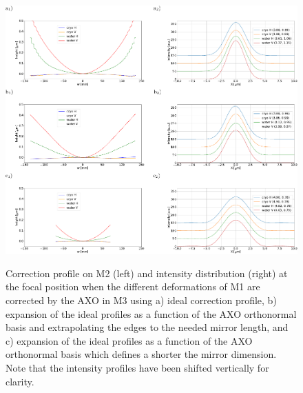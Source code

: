 \documentclass{iucr}
\begin{document}
   \begin{figure}
   \label{fig:intensitycorrected} 
   \includegraphics[width=1.0\textwidth]{figures/fig4.pdf}\\
   \caption
   { Correction profile on M2 (left) and intensity distribution (right) at the focal position when the different deformations of M1 are corrected by the AXO in M3 using  a) ideal correction profile, b)  expansion of the ideal profiles as a function of the AXO orthonormal basis and extrapolating the edges to the needed mirror length, and c)  expansion of the ideal profiles as a function of the AXO orthonormal basis which defines a shorter the mirror dimension. Note that the intensity profiles have been shifted vertically for clarity. }
   \end{figure} 
\end{document}
